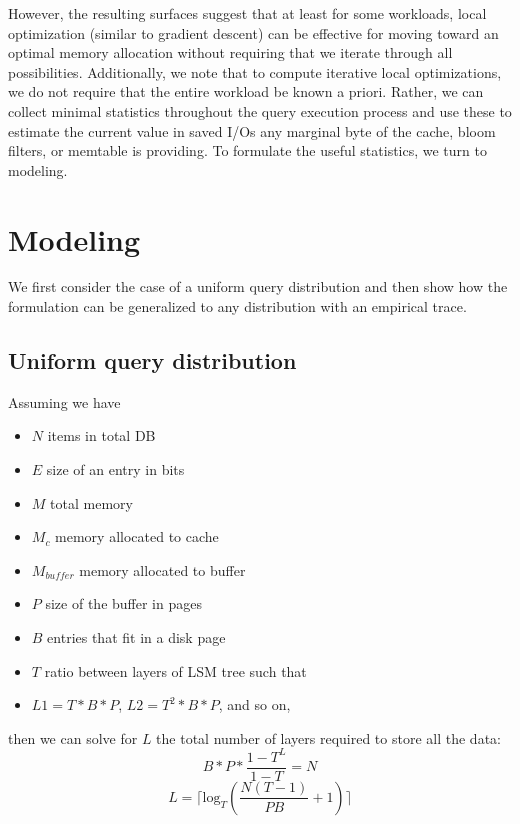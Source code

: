 \documentclass{sig-alternate-05-2015}
\begin{document}
However, the resulting surfaces suggest that at least for some workloads, local
optimization (similar to gradient descent) can be effective for moving toward
an optimal memory allocation without requiring that we iterate through all
possibilities. Additionally, we note that to compute iterative local
optimizations, we do not require that the entire workload be known a priori.
Rather, we can collect minimal statistics throughout the query execution
process and use these to estimate the current value in saved I/Os any marginal
byte of the cache, bloom filters, or memtable is providing. To formulate the
useful statistics, we turn to modeling.

\section{Modeling}

We first consider the case of a uniform query distribution and then show how
the formulation can be generalized to any distribution with an empirical trace.

\subsection{Uniform query distribution}

\noindent Assuming we have
\begin{itemize}
\item $N$ items in total DB \\
\item $E$ size of an entry in bits \\
\item $M$ total memory \\
\item $M_c$ memory allocated to cache \\
\item $M_{buffer}$ memory allocated to buffer\\
\item $P$ size of the buffer in pages \\
\item $B$ entries that fit in a disk page \\
\item $T$ ratio between layers of LSM tree such that \\
\item $L1 = T * B* P$, $L2 =T^2 * B*P $, and so on,
\end{itemize}

\noindent then we can solve for $L$ the total number of layers required to store all the data: \\
$$B*P * \frac{1-T^L}{1-T} = N$$
$$L= \lceil \textrm{log}_{T} \left(\frac{N(T-1)}{PB} + 1\right) \rceil$$
\end{document}
